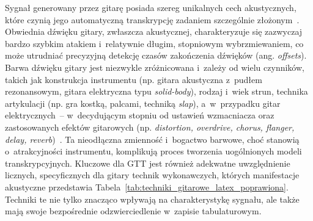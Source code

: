 Sygnał generowany przez gitarę posiada szereg unikalnych cech akustycznych, które czynią jego automatyczną transkrypcję zadaniem szczególnie złożonym~\autocite{Wiggins2019TabCNN,BurletHindle2017IsolatedGuitarTranscription}. Obwiednia dźwięku gitary, zwłaszcza akustycznej, charakteryzuje się zazwyczaj bardzo szybkim atakiem i~relatywnie długim, stopniowym wybrzmiewaniem, co może utrudniać precyzyjną detekcję czasów zakończenia dźwięków (ang. \textit{offsets}). Barwa dźwięku gitary jest niezwykle zróżnicowana i~zależy od wielu czynników, takich jak konstrukcja instrumentu (np. gitara akustyczna z~pudłem rezonansowym, gitara elektryczna typu \textit{solid-body}), rodzaj i~wiek strun, technika artykulacji (np. gra kostką, palcami, techniką \textit{slap}), a~w~przypadku gitar elektrycznych~– w~decydującym stopniu od ustawień wzmacniacza oraz zastosowanych efektów gitarowych (np. \textit{distortion, overdrive, chorus, flanger, delay, reverb})~\autocite{Wiggins2019TabCNN}. Ta nieodłączna zmienność i~bogactwo barwowe, choć stanowią o~atrakcyjności instrumentu, komplikują proces tworzenia uogólnionych modeli transkrypcyjnych. Kluczowe dla GTT jest również adekwatne uwzględnienie licznych, specyficznych dla gitary technik wykonawczych, których manifestacje akustyczne przedstawia Tabela~\ref{tab:techniki_gitarowe_latex_poprawiona}. Techniki te nie tylko znacząco wpływają na charakterystykę sygnału, ale także mają swoje bezpośrednie odzwierciedlenie w~zapisie tabulaturowym.

